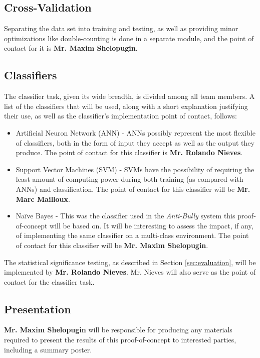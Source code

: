 \documentclass[conference]{sig-alternate-05-2015}
\begin{document}
\subsection{Cross-Validation}\label{sec:validation_task}
Separating the data set into training and testing, as well as providing
minor optimizations like double-counting is done in a separate module, and the
point of contact for it is \textbf{Mr. Maxim Shelopugin}. 

\subsection{Classifiers}\label{sec:classifier_task}
The classifier task, given its wide breadth, is divided among all team
members. A list of the classifiers that will be used, along with a short
explanation justifying their use, as well as the classifier's implementation
point of contact, follows:
\begin{itemize}
  \item Artificial Neuron Network (ANN) - ANNs possibly represent
  the most flexible of classifiers, both in the form of input they accept as
  well as the output they produce. The point of contact for this classifier is
  \textbf{Mr. Rolando Nieves}.
  \item Support Vector Machines (SVM) - SVMs have the possibility of requiring
  the least amount of computing power during both training (as compared with
  ANNs) and classification. The point of contact for this classifier will be
  \textbf{Mr. Marc Mailloux}.
  \item Na\"{i}ve Bayes - This was the classifier used in the \textit{Anti-Bully}
  system this proof-of-concept will be based on. It will be interesting to
  assess the impact, if any, of implementing the same classifier on a
  multi-class environment. The point of contact for this classifier will be
  \textbf{Mr. Maxim Shelopugin}.
\end{itemize}

The statistical significance testing, as described in Section
\ref{sec:evaluation}, will be implemented by \textbf{Mr. Rolando Nieves}. Mr.
Nieves will also serve as the point of contact for the classifier task.

\subsection{Presentation}\label{sec:presentation_task}
\textbf{Mr. Maxim Shelopugin} will be responsible for producing any materials
required to present the results of this proof-of-concept to interested parties,
including a summary poster.
\end{document}
